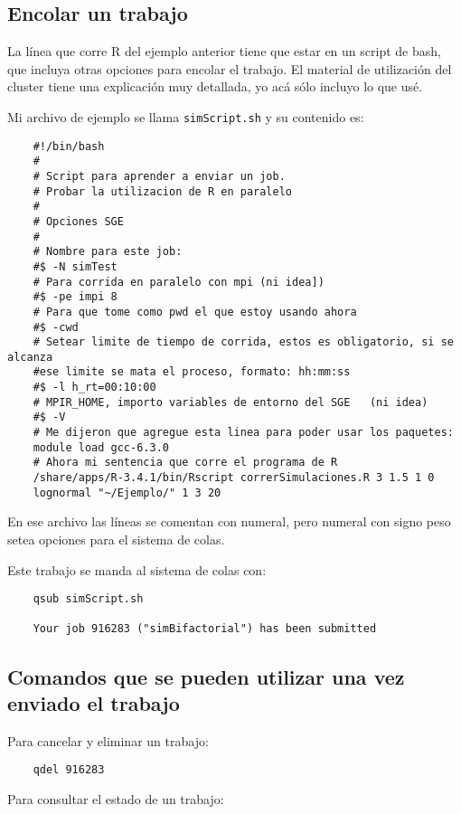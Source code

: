 \documentclass[paper=a4, fontsize=11pt]{scrartcl} %
\numberwithin{equation}{section} %
\numberwithin{figure}{section} %
\numberwithin{table}{section} %
\begin{document}
\subsection{Encolar un trabajo}

La línea que corre R del ejemplo anterior tiene que estar en un script de bash, que incluya otras opciones para encolar el trabajo. El material de utilización del cluster tiene una explicación muy detallada, yo acá sólo incluyo lo que usé.

Mi archivo de ejemplo se llama \texttt{simScript.sh} y su contenido es:

\begin{verbatim}
	#!/bin/bash
	# 
	# Script para aprender a enviar un job.	
	# Probar la utilizacion de R en paralelo
	#
	# Opciones SGE 
	#
	# Nombre para este job:
	#$ -N simTest
	# Para corrida en paralelo con mpi (ni idea])
	#$ -pe impi 8
	# Para que tome como pwd el que estoy usando ahora
	#$ -cwd
	# Setear limite de tiempo de corrida, estos es obligatorio, si se alcanza 
	#ese limite se mata el proceso, formato: hh:mm:ss
	#$ -l h_rt=00:10:00
	# MPIR_HOME, importo variables de entorno del SGE	(ni idea)
	#$ -V
	# Me dijeron que agregue esta linea para poder usar los paquetes:
	module load gcc-6.3.0
	# Ahora mi sentencia que corre el programa de R
	/share/apps/R-3.4.1/bin/Rscript correrSimulaciones.R 3 1.5 1 0 
	lognormal "~/Ejemplo/" 1 3 20
\end{verbatim}

En ese archivo las líneas se comentan con numeral, pero numeral con signo peso setea opciones para el sistema de colas.

Este trabajo se manda al sistema de colas con:

\begin{verbatim}
	qsub simScript.sh
	
	Your job 916283 ("simBifactorial") has been submitted
\end{verbatim}

\subsection{Comandos que se pueden utilizar una vez enviado el trabajo}

Para cancelar y eliminar un trabajo:

\begin{verbatim}
	qdel 916283
\end{verbatim}

Para consultar el estado de un trabajo:
\end{document}
